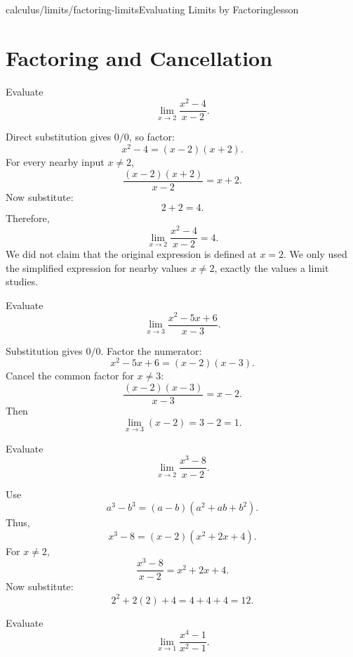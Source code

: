 \begin{webpage}{calculus/limits/factoring-limits}{Evaluating Limits by Factoring}{lesson}
\section{Factoring and Cancellation}


\begin{bgguided}[title={Why cancellation is legal in a limit}]
Evaluate
\[
  \lim_{x\to2}\frac{x^2-4}{x-2}.
\]

\begin{bgsolution}
Direct substitution gives \(0/0\), so factor:
\[
  x^2-4=(x-2)(x+2).
\]
For every nearby input \(x\ne2\),
\[
  \frac{(x-2)(x+2)}{x-2}=x+2.
\]
Now substitute:
\[
  2+2=4.
\]
Therefore,
\[
  \boxed{\lim_{x\to2}\frac{x^2-4}{x-2}=4}.
\]
We did not claim that the original expression is defined at \(x=2\). We only used the simplified expression for nearby values \(x\ne2\), exactly the values a limit studies.
\end{bgsolution}
\end{bgguided}



\begin{bgexample}[title={Factor a quadratic}]
Evaluate
\[
  \lim_{x\to3}\frac{x^2-5x+6}{x-3}.
\]

\begin{bgsolution}
Substitution gives \(0/0\). Factor the numerator:
\[
  x^2-5x+6=(x-2)(x-3).
\]
Cancel the common factor for \(x\ne3\):
\[
  \frac{(x-2)(x-3)}{x-3}=x-2.
\]
Then
\[
  \lim_{x\to3}(x-2)=3-2=\boxed{1}.
\]
\end{bgsolution}
\end{bgexample}

\begin{bgexample}[title={Difference of cubes}]
Evaluate
\[
  \lim_{x\to2}\frac{x^3-8}{x-2}.
\]

\begin{bgsolution}
Use
\[
  a^3-b^3=(a-b)(a^2+ab+b^2).
\]
Thus,
\[
  x^3-8=(x-2)(x^2+2x+4).
\]
For \(x\ne2\),
\[
  \frac{x^3-8}{x-2}=x^2+2x+4.
\]
Now substitute:
\[
  2^2+2(2)+4=4+4+4=\boxed{12}.
\]
\end{bgsolution}
\end{bgexample}

\begin{bgexample}[title={Exam-level: factor more than once}]
Evaluate
\[
  \lim_{x\to1}\frac{x^4-1}{x^2-1}.
\]


\end{bgexample}
\end{webpage}
